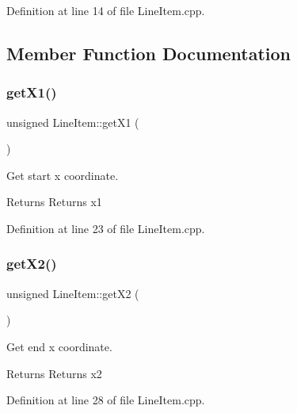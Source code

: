 Definition at line 14 of file Line\+Item.\+cpp.



\subsection{Member Function Documentation}
\mbox{\label{classLineItem_a8862ea60a3804d346e9801f79c67af76}} 
\subsubsection{\texorpdfstring{get\+X1()}{getX1()}}
{\footnotesize\ttfamily unsigned Line\+Item\+::get\+X1 (\begin{DoxyParamCaption}{ }\end{DoxyParamCaption})}



Get start x coordinate. 

\begin{DoxyReturn}{Returns}
Returns x1 
\end{DoxyReturn}


Definition at line 23 of file Line\+Item.\+cpp.

\mbox{\label{classLineItem_addce0ef5af72c233e2c7bf019c7a693d}} 
\subsubsection{\texorpdfstring{get\+X2()}{getX2()}}
{\footnotesize\ttfamily unsigned Line\+Item\+::get\+X2 (\begin{DoxyParamCaption}{ }\end{DoxyParamCaption})}



Get end x coordinate. 

\begin{DoxyReturn}{Returns}
Returns x2 
\end{DoxyReturn}


Definition at line 28 of file Line\+Item.\+cpp.

\mbox{\label{classLineItem_abbdf5be2637561802ea22385c7c11df5}} 
